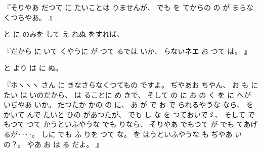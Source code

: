 %
『そりやあ
だつて
に
たいことは
りませんが、
%
でも
を
てからの
の
が
まらなくつちやあ。
』

%
と
に
のみを
して
え
れぬ
をすれば、

%
『だから
に
いて
くやうに
が
つて
るでは
いか、
%
らないネエ
お
つて
は。
』

%
と
より
は
に
ぬ。

%
『ホヽヽヽ
さん
に
きなさらなくつてもの
ですよ。
%
ぢやあお
ちやん、
%
お
も
に
たい
は
いのだから、
%
は
ることに
め
きで、
%
そして
の
に
お
の
く
を
に
へが
いぢやあ
いか。
%
だつたか
かの
の
に、
%
あ
が
で
お
で
られるやうな
なら、
%
をかいて
んで
たいと
ひの
があつたが、
%
でも
し
な
を
つておいでゞ、
%
そして
でもつて
つて
かうといふやうな
でも
りなら、
%
そりやあ
でもつて
が
でも
てあげるが‥‥。
%
しに
でも
ふ
りを
つて
な。
%
を
はうといふやうな
も
ぢやあ
いの？。
%
やあ
お
は
る
だよ。
』

